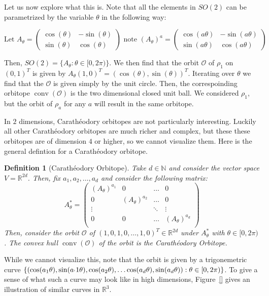 \documentclass[12]{amsart}
\newtheorem{definition}[theorem]{Definition}
\newcommand{\R}[0]{\mathbb{R}}
\newcommand{\orb}[0]{\mathcal{O}}
\DeclareMathOperator{\conv}{conv}
\begin{document}
Let us now explore what this is. Note that all the elements in $SO(2)$ can be parametrized by the variable $\theta$ in the following way:

\begin{equation*}
    \text{Let }A_\theta = 
    \begin{pmatrix}
        \cos(\theta) & -\sin(\theta) \\
        \sin(\theta) & \cos(\theta)
    \end{pmatrix}
    \text { note }
    (A_\theta)^a = 
    \begin{pmatrix}
        \cos(a\theta) & -\sin(a\theta) \\
        \sin(a\theta) & \cos(a\theta)
    \end{pmatrix}
\end{equation*}

Then, $SO(2) = \{ A_\theta: \theta \in [0,2\pi)\}$.
We then find that the orbit $\orb$ of $\rho_1$ on $(0,1)^T$ is given by $A_\theta (1,0)^T = (\cos(\theta), \sin(\theta))^T$. Iterating over $\theta$ we find that the $\orb$ is given simply by the unit circle. Then, the correspoinding orbitope $\conv(\orb)$ is the two dimensional closed unit ball. We considered $\rho_1$, but the orbit of $\rho_a$ for any $a$ will result in the same orbitope.

In $2$ dimensions, Carath\'{e}odory orbitopes are not particularly interesting. Luckily all other Carath\'{e}odory orbitopes are much richer and complex, but these these orbitopes are of dimension $4$ or higher, so we cannot visualize them. Here is the general defintion for a Carath\'{e}odory orbitope.
\begin{definition}[Carath\'{e}odory Orbitope]
    Take $d \in \mathbb{N}$ and consider the vector space $V = \R^{2d}$. Then, fix $a_1, a_2, \dots, a_d$ and consider the following matrix:
    \begin{equation*}
    A_\theta^* = 
    \begin{pmatrix}
        (A_\theta)^{a_1} & 0 & \dots & 0 \\
        0 & (A_\theta)^{a_2} & \dots & 0 \\
        \vdots & & \ddots & \vdots \\
        0 & 0 & \dots & (A_\theta)^{a_d}\\
    \end{pmatrix}
    \end{equation*}
    Then, consider the orbit $\orb$ of $(1,0,1,0,\dots,1,0)^T \in \R^{2d}$ under $A_\theta^*$ with $\theta \in [0,2\pi)$. The convex hull $\conv(\orb)$ of the orbit is the Carath\'{e}odory Orbitope.
\end{definition}
While we cannot visualize this, note that the orbit is given by a trigonemetric curve $\{ (\cos(a_1\theta), \sin(a_`1\theta), \cos(a_2\theta),\dots \cos(a_d\theta), \sin(a_d\theta)): \theta \in [0,2\pi) \}$. To give a sense of what such a curve may look like in high dimensions, Figure~\ref{} gives an illustration of similar curves in $\R^3$.
\end{document}
